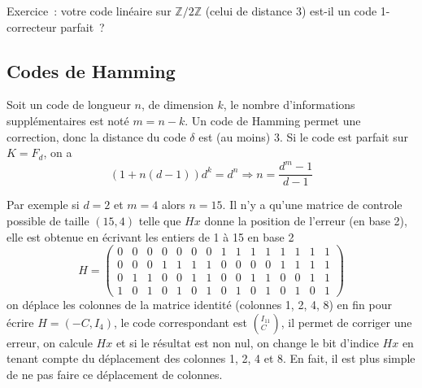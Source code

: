 \documentclass[a4paper,11pt]{book}
\begin{document}
\begin{giacjshere}
Exercice~: votre code linéaire sur $\mathbb{Z}/2\mathbb{Z}$ (celui de distance 3) 
est-il un code 1-correcteur parfait~?

\subsection{Codes de Hamming}
Soit un code de longueur $n$, de dimension $k$, le nombre
d'informations suppl\'ementaires est not\'e $m=n-k$. Un code
de Hamming 
permet une correction, donc la distance du code
$\delta$ est (au moins) 3. Si le code est parfait sur $K=F_d$, on a 
$$ (1+n(d-1))d^k=d^{n} \Rightarrow n=\frac{d^m-1}{d-1}$$

Par exemple si $d=2$ et $m=4$ alors $n=15$. 
Il n'y a qu'une matrice de controle possible de taille
$(15,4)$ telle que $Hx$ donne la position de l'erreur (en base 2),
elle est obtenue en \'ecrivant les entiers de 1 \`a 15 en base 2
$$ H=\left( \begin{array}{ccccccccccccccc}
0 & 0 & 0 & 0 & 0 & 0 & 0 & 1 & 1 & 1 & 1 & 1 & 1 & 1 & 1 \\
0 & 0 & 0 & 1 & 1 & 1 & 1 & 0 & 0 & 0 & 0 & 1 & 1 & 1 & 1 \\
0 & 1 & 1 & 0 & 0 & 1 & 1 & 0 & 0 & 1 & 1 & 0 & 0 & 1 & 1 \\
1 & 0 & 1 & 0 & 1 & 0 & 1 & 0 & 1 & 0 & 1 & 0 & 1 & 0 & 1
 \end{array} \right)$$
on d\'eplace les colonnes de la matrice identit\'e 
(colonnes 1, 2, 4, 8)
en fin pour \'ecrire $H=(-C,I_4)$, le code correspondant est
$\left( ^{I_{11}} _C \right)$, il permet de corriger une erreur,
on calcule $Hx$ et si le r\'esultat est non nul, on change le
bit d'indice $Hx$ en tenant compte du d\'eplacement des colonnes
1, 2, 4 et 8. En fait, il est plus simple de ne pas faire ce
d\'eplacement de colonnes.


\end{giacjshere}
\end{document}
